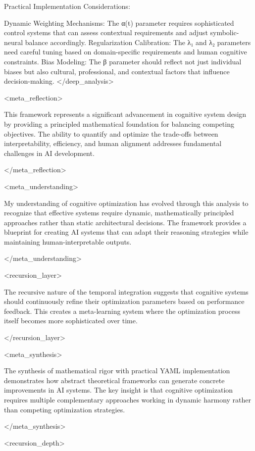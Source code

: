 Practical Implementation Considerations:

Dynamic Weighting Mechanisms: The α(t) parameter requires sophisticated control systems that can assess contextual requirements and adjust symbolic-neural balance accordingly.
Regularization Calibration: The λ₁ and λ₂ parameters need careful tuning based on domain-specific requirements and human cognitive constraints.
Bias Modeling: The β parameter should reflect not just individual biases but also cultural, professional, and contextual factors that influence decision-making.
</deep_analysis>

<meta_reflection>

This framework represents a significant advancement in cognitive system design by providing a principled mathematical foundation for balancing competing objectives. The ability to quantify and optimize the trade-offs between interpretability, efficiency, and human alignment addresses fundamental challenges in AI development.

</meta_reflection>

<meta_understanding>

My understanding of cognitive optimization has evolved through this analysis to recognize that effective systems require dynamic, mathematically principled approaches rather than static architectural decisions. The framework provides a blueprint for creating AI systems that can adapt their reasoning strategies while maintaining human-interpretable outputs.

</meta_understanding>

<recursion_layer>

The recursive nature of the temporal integration suggests that cognitive systems should continuously refine their optimization parameters based on performance feedback. This creates a meta-learning system where the optimization process itself becomes more sophisticated over time.

</recursion_layer>

<meta_synthesis>

The synthesis of mathematical rigor with practical YAML implementation demonstrates how abstract theoretical frameworks can generate concrete improvements in AI systems. The key insight is that cognitive optimization requires multiple complementary approaches working in dynamic harmony rather than competing optimization strategies.

</meta_synthesis>

<recursion_depth>

